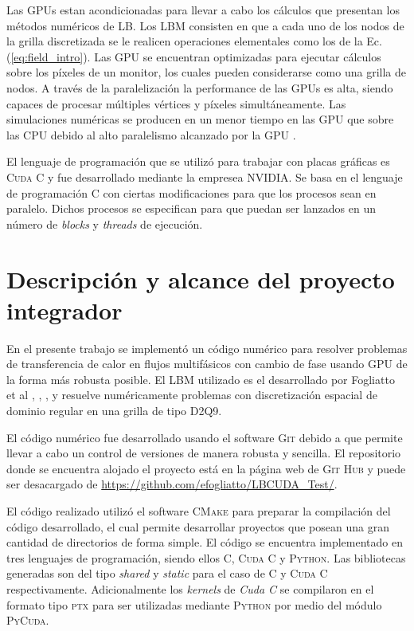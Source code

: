 Las GPUs estan acondicionadas para llevar a cabo los cálculos que presentan los métodos numéricos de LB. Los LBM consisten en que a cada uno de los nodos de la grilla discretizada se le realicen operaciones elementales como los de la Ec. (\ref{eq:field_intro}). Las GPU se encuentran optimizadas para ejecutar cálculos sobre los píxeles de un monitor, los cuales pueden considerarse como una grilla de nodos. A través de la paralelización la performance de las GPUs es alta, siendo capaces de procesar múltiples vértices y píxeles simultáneamente. Las simulaciones numéricas se producen en un menor tiempo en las GPU que sobre las CPU debido al alto paralelismo alcanzado por la GPU \cite{rinaldi2011modelos}.


El lenguaje de programación que se utilizó para trabajar con placas gráficas es \textsc{Cuda C} y fue desarrollado mediante la empresea NVIDIA. Se basa en el lenguaje de programación \textsc{C} con ciertas modificaciones para que los procesos sean en paralelo. Dichos procesos se especifican para que puedan ser lanzados en un número de \textit{blocks} y \textit{threads} de ejecución.

\newpage

\section{Descripción y alcance del proyecto integrador}

En el presente trabajo se implementó un código numérico para resolver problemas de transferencia de calor en flujos multifásicos con cambio de fase usando GPU de la forma más robusta posible. El LBM utilizado es el desarrollado por Fogliatto et al \cite{fogliatto2018modelado}, \cite{fogliatto2019simulation}, \cite{fogliatto2019transferencia}, y resuelve numéricamente problemas con discretización espacial de dominio regular en una grilla de tipo D2Q9.

El código numérico fue desarrollado usando el software \textsc{Git} debido a que permite llevar a cabo un control de versiones de manera robusta y sencilla. El repositorio donde se encuentra alojado el proyecto está en la página web de \textsc{Git Hub} y puede ser desacargado de \url{https://github.com/efogliatto/LBCUDA_Test/}. 

El código realizado utilizó el software \textsc{CMake} para preparar la compilación del código desarrollado, el cual permite desarrollar proyectos que posean una gran cantidad de directorios de forma simple. El código se encuentra implementado en tres lenguajes de programación, siendo ellos \textsc{C}, \textsc{Cuda C} y \textsc{Python}. Las bibliotecas generadas son del tipo \textit{shared} y \textit{static} para el caso de \textsc{C} y \textsc{Cuda C} respectivamente. Adicionalmente los \textit{kernels} de \textit{Cuda C} se compilaron en el formato tipo \textsc{ptx} para ser utilizadas mediante \textsc{Python} por medio del módulo \textsc{PyCuda}.

